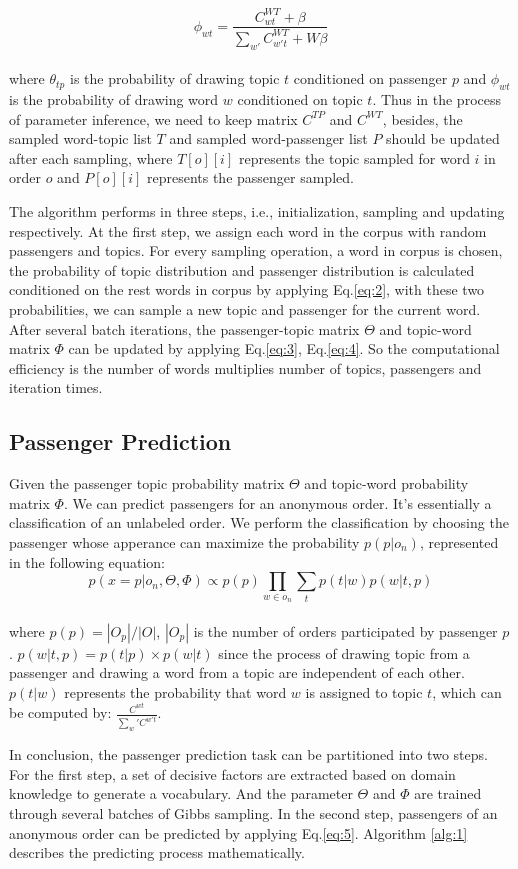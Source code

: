 \documentclass{llncs}
\begin{document}
\begin{equation}
\label{eq:4}
\phi_{wt} = \frac{C_{wt}^{WT}+\beta}{\sum_{w'}C_{w't}^{WT}+W\beta}
\end{equation}\\
where $\theta_{tp}$ is the probability of drawing topic $t$ conditioned on passenger $p$ and $\phi_{wt}$ is the probability of drawing word $w$ conditioned on topic $t$. Thus in the process of parameter inference, we need to keep matrix $C^{TP}$ and $C^{WT}$, besides, the sampled word-topic list $T$ and sampled word-passenger list $P$ should be updated after each sampling, where $T[o][i]$ represents the topic sampled for word $i$ in order $o$ and $P[o][i]$ represents the passenger sampled.\par
The algorithm performs in three steps, i.e., initialization, sampling and updating respectively. At the first step, we assign each word in the corpus with random passengers and topics. For every sampling operation, a word in corpus is chosen, the probability of topic distribution and passenger distribution is calculated conditioned on the rest words in corpus by applying Eq.\ref{eq:2}, with these two probabilities, we can sample a new topic and passenger for the current word. After several batch iterations, the passenger-topic matrix $\Theta$ and topic-word matrix $\Phi$ can be updated by applying Eq.\ref{eq:3}, Eq.\ref{eq:4}. So the computational efficiency is the number of words multiplies number of topics, passengers and iteration times.\par
\subsection{Passenger Prediction}
Given the passenger topic probability matrix $\Theta$ and topic-word probability matrix $\Phi$. We can predict passengers for an anonymous order. It's essentially a classification of an unlabeled order\cite{shanshan:unpopular}. We perform the classification by choosing the passenger whose apperance can maximize the probability $p(p|o_n)$, represented in the following equation:\\
\begin{equation}
\label{eq:5}
p(x=p|o_n,\Theta,\Phi) \propto p(p)\prod_{w \in o_n}\sum_t p(t|w)p(w|t,p)
\end{equation}\\
where $p(p) = |O_p| / |O|$, $|O_p|$ is the number of orders participated by passenger $p$. $p(w|t,p) = p(t|p) \times p(w|t)$ since the process of drawing topic from a passenger and drawing a word from a topic are independent of each other. $p(t|w)$ represents the probability that word $w$ is assigned to topic $t$, which can be computed by: $\frac{C^{wt}}{\sum_w'C^{w't}}$.\par
In conclusion, the passenger prediction task can be partitioned into two steps. For the first step, a set of decisive factors are extracted based on domain  knowledge to generate a vocabulary. And the parameter $\Theta$ and $\Phi$ are trained through several batches of Gibbs sampling. In the second step, passengers of an anonymous order can be predicted by applying Eq.\ref{eq:5}. Algorithm \ref{alg:1} describes the predicting process mathematically.\par
\end{document}
